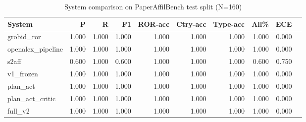 \begin{table}[ht]
  \centering
  \caption{System comparison on PaperAffilBench test split (N=160)}
  \label{tab:system_comparison}
  \begin{tabular}{lrrrrrrrrr}
    \toprule
    System & P & R & F1 & ROR-acc & Ctry-acc & Type-acc & All\% & ECE \\
    \midrule
    grobid\_ror & 1.000 & 1.000 & 1.000 & 1.000 & 1.000 & 1.000 & 1.000 & 0.000 \\
    openalex\_pipeline & 1.000 & 1.000 & 1.000 & 1.000 & 1.000 & 1.000 & 1.000 & 0.000 \\
    s2aff & 0.600 & 1.000 & 0.600 & 1.000 & 1.000 & 1.000 & 0.600 & 0.750 \\
    v1\_frozen & 1.000 & 1.000 & 1.000 & 1.000 & 1.000 & 1.000 & 1.000 & 0.000 \\
    plan\_act & 1.000 & 1.000 & 1.000 & 1.000 & 1.000 & 1.000 & 1.000 & 0.000 \\
    plan\_act\_critic & 1.000 & 1.000 & 1.000 & 1.000 & 1.000 & 1.000 & 1.000 & 0.000 \\
    full\_v2 & 1.000 & 1.000 & 1.000 & 1.000 & 1.000 & 1.000 & 1.000 & 0.000 \\
    \bottomrule
  \end{tabular}
\end{table}
